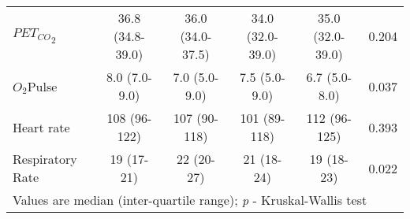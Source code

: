 \begin{sidewaystable}[p]
\begin{tabular}{|l| c c c c c|}
		${PET_{CO}}_2$                 & 36.8 (34.8-39.0)    & 36.0 (34.0-37.5)    & 34.0 (32.0-39.0)    & 35.0 (32.0-39.0)    & 0.204      \\
		$O_2$Pulse                     & 8.0 (7.0-9.0)       & 7.0 (5.0-9.0)       & 7.5 (5.0-9.0)       & 6.7 (5.0-8.0)       & 0.037      \\
		Heart rate                     & 108 (96-122)        & 107 (90-118)        & 101 (89-118)        & 112 (96-125)        & 0.393      \\
		Respiratory Rate               & 19 (17-21)          & 22 (20-27)          & 21 (18-24)          & 19 (18-23)          & 0.022      \\ \hline
		\multicolumn{6}{l}{Values are median (inter-quartile range); \textit{p} - Kruskal-Wallis test}
	\end{tabular}
\end{sidewaystable}


